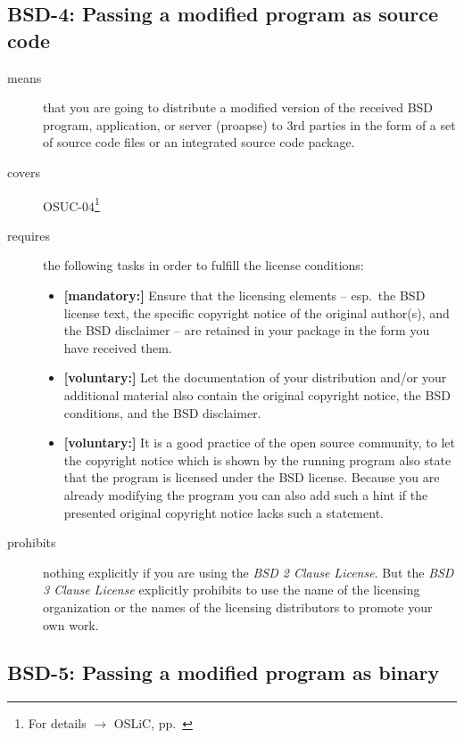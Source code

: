 \subsection{BSD-4: Passing a modified program as source code}
\label{OSUC-04-BSD}

\begin{description}
\item[means] that you are going to distribute a modified version of the received
BSD program, application, or server (proapse) to 3rd parties in the form of a set
of source code files or an integrated source code package.
\item[covers] OSUC-04\footnote{For details $\rightarrow$ OSLiC, pp.\ \pageref{OSUC-04-DEF}}
\item[requires] the following tasks in order to fulfill the license conditions:
\begin{itemize}
  \item \textbf{[mandatory:]} Ensure that the licensing elements -- esp.\
  the BSD license text, the specific copyright notice of the original author(s),
  and the BSD disclaimer -- are retained in your package in the form you have
  received them.
  
  \item \textbf{[voluntary:]} Let the documentation of your distribution and/or
  your additional material also contain the original copyright notice, the BSD
  conditions, and the BSD disclaimer.
  
  \item \textbf{[voluntary:]} It is a good practice of the open source
  community, to let the copyright notice which is shown by the running program
  also state that the program is licensed under the BSD license. Because you are
  already modifying the program you can also add such a hint if the presented
  original copyright notice lacks such a statement.
\end{itemize}

\item[prohibits] nothing explicitly if you are using the \emph{BSD 2 Clause
License}. But the \emph{BSD 3 Clause License} explicitly prohibits to use the
name of the licensing organization or the names of the licensing distributors to
promote your own work.

\end{description}

\subsection{BSD-5: Passing a modified program as binary}

